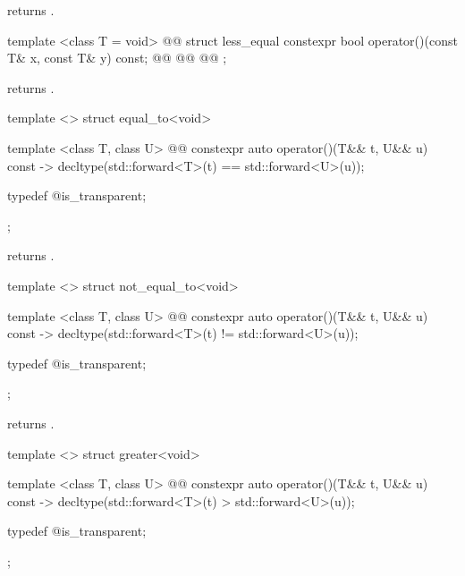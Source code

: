 \begin{itemdescr}
\pnum
{} returns .
\end{itemdescr}

%
\begin{itemdecl}
template <class T = void>
  @@
struct less_equal {
  constexpr bool operator()(const T& x, const T& y) const;
  @@
  @@
  @@
};
\end{itemdecl}

\begin{itemdescr}
\pnum
{} returns .
\end{itemdescr}

%
\begin{itemdecl}
template <> struct equal_to<void> {
  template <class T, class U>
    @@
  constexpr auto operator()(T&& t, U&& u) const
    -> decltype(std::forward<T>(t) == std::forward<U>(u));

  typedef @\unspec@ is_transparent;
};
\end{itemdecl}

\begin{itemdescr}
\pnum
{} returns .
\end{itemdescr}

%
\begin{itemdecl}
template <> struct not_equal_to<void> {
  template <class T, class U>
    @@
  constexpr auto operator()(T&& t, U&& u) const
    -> decltype(std::forward<T>(t) != std::forward<U>(u));

  typedef @\unspec@ is_transparent;
};
\end{itemdecl}

\begin{itemdescr}
\pnum
{} returns .
\end{itemdescr}

%
\begin{itemdecl}
template <> struct greater<void> {
  template <class T, class U>
    @@
  constexpr auto operator()(T&& t, U&& u) const
    -> decltype(std::forward<T>(t) > std::forward<U>(u));

  typedef @\unspec@ is_transparent;
};
\end{itemdecl}

